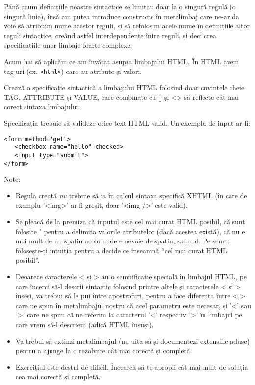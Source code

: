Până acum definițiile noastre sintactice se limitau doar la
o singură regulă (o singură linie), însă am putea introduce
constructe în metalimbaj care ne-ar da voie să atribuim nume
acestor reguli, și să refolosim acele nume în definițiile altor
reguli sintactice, creând astfel interdependențe între reguli,
și deci crea specificațiile unor limbaje foarte complexe.


\begin{Exercise}[title={Sintaxa HTML},label={ex:sintaxa_html},difficulty=3]
Acum hai să aplicăm ce am învățat asupra limbajului HTML. În HTML avem
tag-uri (ex. \texttt{<html>}) care au atribute și valori.

Crează o specificație sintactică a limbajului HTML folosind
doar cuvintele cheie TAG, ATTRIBUTE și VALUE, care combinate
cu [] și <> să reflecte cât mai corect sintaxa limbajului.

Specificația trebuie să valideze orice text HTML valid.
Un exemplu de input ar fi:
\begin{verbatim}
<form method="get">
   <checkbox name="hello" checked>
   <input type="submit">
</form>
\end{verbatim}
\ExeText
Note:
\begin{itemize}
\item Regula creată \textit{nu} trebuie să ia în calcul sintaxa
specifică XHTML (în care de exemplu '<img>' ar fi greșit, doar '<img />' este valid).
\item Se pleacă de la premiza că inputul este cel mai curat HTML posibil, că
sunt folosite " pentru a delimita valorile atributelor (dacă acestea există), că
nu e mai mult de un spațiu acolo unde e nevoie de spațiu, ș.a.m.d. Pe scurt:
folosește-ți intuiția pentru a decide ce înseamnă ``cel mai curat HTML posibil''.
\item Deoarece caracterele < și > au o semnificație specială în limbajul HTML, pe
care încerci să-l descrii sintactic folosind printre altele
și caracterele < și > înseși, va trebui să le pui între apostrofuri, pentru a face
diferența între <,> care ne spun în metalimbajul nostru
că acel parametru este necesar, și '<' sau '>' care
ne spun că ne referim la caracterul '<' respectiv '>' în limbajul pe care
vrem să-l descriem (adică HTML însuși).
\item Va trebui să extinzi metalimbajul (nu uita să și documentezi extensiile aduse)
pentru a ajunge la o rezolvare cât mai corectă și completă
\item Exercițiul este destul de dificil. Încearcă să te apropii cât mai mult de soluția
cea mai corectă și completă.
\end{itemize}
\end{Exercise}
